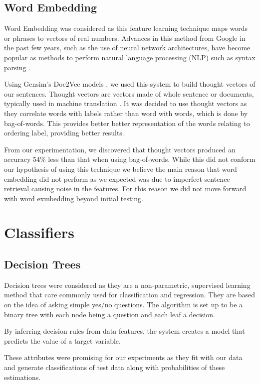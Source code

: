 \documentclass[bsc,frontabs,twoside,singlespacing,parskip,deptreport]{infthesis}     %
\begin{document}
\subsection{Word Embedding} \label{sec:word-embedding}
Word Embedding was considered as this feature learning technique maps words or phrases to vectors of real numbers.
Advances in this method from Google in the past few years, such as the use of neural network architectures, have become
popular as methods to perform natural language processing (NLP) such as syntax parsing \cite{socher2013parsing}.

Using Gensim's Doc2Vec models \cite{rehurek_lrec}, we used this system to build thought vectors of our sentences.
Thought vectors are vectors made of whole sentence or documents, typically used in machine translation \cite{deeplearning4j}.
It was decided to use thought vectors as they correlate words with labels rather than word with words, which is done by bag-of-words.
This provides better better representation of the words relating to ordering label, providing better results.



From our experimentation, we discovered that thought vectors produced an accuracy 54\% less than that when
using bag-of-words. While this did not conform our hypothesis of using this technique we believe
the main reason that word embedding did not perform as we expected was due to imperfect sentence retrieval causing noise in
the features. For this reason we did not move forward with word exmbedding beyond initial testing.

\section{Classifiers}\label{sec:classifiers}
\subsection{Decision Trees}
Decision trees were considered as they are a non-parametric, supervised learning method that care commonly used for
classification and regression.
They are based on the idea of asking simple yes/no questions. The algorithm is set up to be a binary tree with
each node being a question and each leaf a decision.

By inferring decision rules from data features, the system creates a model that predicts the value of a target variable.

These attributes were promising for our experiments as they fit with our data and generate
classifications of test data along with probabilities of these estimations.
\end{document}
